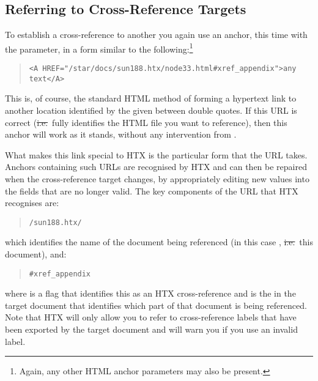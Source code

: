 \subsection{\label{sect:referringtotargets}Referring to Cross-Reference Targets}

To establish a cross-reference to another  you again
use an  anchor, this time with the  parameter,
in a form similar to the following:\footnote{Again, any other HTML
anchor parameters may also be present.}

\begin{quote}
\begin{verbatim}
<A HREF="/star/docs/sun188.htx/node33.html#xref_appendix">any text</A>
\end{verbatim}
\end{quote}

This is, of course, the standard HTML method of forming a hypertext
link to another location identified by the  given between double quotes. If this URL is
correct (\st{i.e.}\ fully identifies the HTML file you want to
reference), then this anchor will work as it stands, without any
intervention from .

What makes this link special to HTX is the particular form that the
URL takes.  Anchors containing such URLs are recognised by HTX and can
then be repaired when the cross-reference target changes, by
appropriately editing new values into the fields that are no longer
valid. The key components of the URL that HTX recognises are:

\begin{quote}
\begin{verbatim}
/sun188.htx/
\end{verbatim}
\end{quote}

which identifies the name of the document being referenced (in this
case , \st{i.e.}\ this document), and:

\begin{quote}
\begin{verbatim}
#xref_appendix
\end{verbatim}
\end{quote}

where  is a flag that identifies this
as an HTX cross-reference and  is the
 in the target document that identifies
which part of that document is being referenced. Note that HTX will
only allow you to refer to cross-reference labels that have been
exported by the target document and will warn you if you use an
invalid label.

